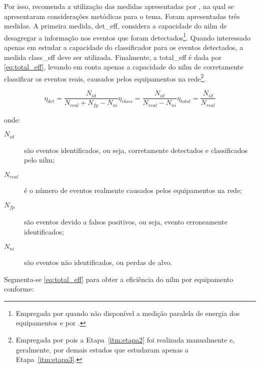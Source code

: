 Por isso, \cite{nilm_zeifman_review_2011} recomenda a utilização das
medidas apresentadas por \cite{nilm_liang_pt1_2010_34}, na qual se
apresentaram considerações metódicas para o tema. Foram apresentadas
três medidas. A primeira medida, \gls{det_eff}, considera a capacidade
do \gls{nilm} de desagregar a informação nos eventos que foram
detectados\footnote{Empregada por \cite{nilm_hart_1992_8} quando não
disponível a medição paralela de energia dos equipamentos e por
\cite{nilm_gupta_patel_2010_30}.}. Quando interessado apenas em
estudar a capacidade do classificador para os eventos detectados, a
medida \gls{class_eff} deve ser utilizada. Finalmente, a
\gls{total_eff} é dada por \ref{eq:total_eff}, levando em conta apenas
a capacidade do \gls{nilm} de corretamente classificar os eventos
reais, causados pelos equipamentos na rede\footnote{Empregada por
\cite{nilm_patel_2007_29,nilm_berges_2009_36} pois a
Etapa~\ref{itm:etapa2} foi realizada manualmente
\label{fn:patel_manual} e, geralmente, por demais estudos que
estudaram apenas a Etapa~\ref{itm:etapa3}.}.

\begin{subequations}\label{eq:eff}
\begin{equation}\label{eq:det_eff}
\eta_{det} = \frac{N_{id}}{N_{real} + N_{fp} - N_{ni}}
\end{equation}
\begin{equation}\label{eq:class_eff}
\eta_{class} = \frac{N_{id}}{N_{real} - N_{ni}}
\end{equation}
\begin{equation}\label{eq:total_eff}
\eta_{total} = \frac{N_{id}}{N_{real}}
\end{equation}
\end{subequations}

\noindent onde:

\begin{description}
\item[$N_{id}$] são eventos identificados, ou seja, corretamente
detectados e classificados pelo \gls{nilm};
\item[$N_{real}$] é o número de eventos realmente causados pelos
equipamentos na rede;
\item[$N_{fp}$] são eventos devido a falsos positivos, ou seja,
evento erroneamente identificados;
\item[$N_{ni}$] são eventos não identificados, ou perdas de alvo.
\end{description}

Segmenta-se \ref{eq:total_eff} para obter a eficiência do \gls{nilm}
por equipamento conforme:

